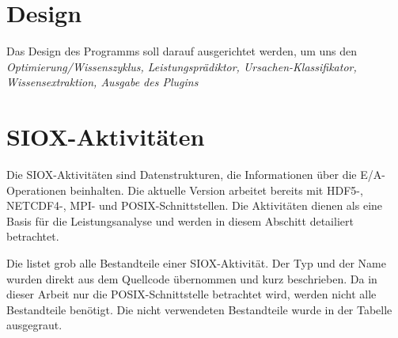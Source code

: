 \section{Design}
Das Design des Programms soll darauf ausgerichtet werden, um uns den 
\textit{Optimierung/Wissenszyklus, Leistungsprädiktor, Ursachen-Klassifikator, Wissensextraktion, Ausgabe des Plugins}


\section{SIOX-Aktivitäten}
Die SIOX-Aktivitäten sind Datenstrukturen, die Informationen über die E/A-Operationen beinhalten.
Die aktuelle Version arbeitet bereits mit HDF5-, NETCDF4-, MPI- und POSIX-Schnittstellen.
Die Aktivitäten dienen als eine Basis für die Leistungsanalyse und werden in diesem Abschitt detailiert betrachtet.

Die  listet grob alle Bestandteile einer SIOX-Aktivität.
Der Typ und der Name wurden direkt aus dem Quellcode übernommen und kurz beschrieben.
Da in dieser Arbeit nur die POSIX-Schnittstelle betrachtet wird, werden nicht alle Bestandteile benötigt.
Die nicht verwendeten Bestandteile wurde in der Tabelle ausgegraut.

